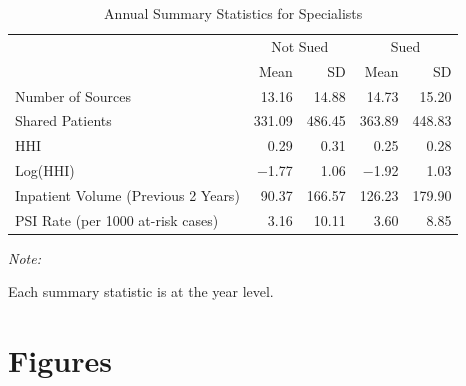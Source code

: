 \documentclass[
  12pt,
]{article}
\begin{document}
\FloatBarrier

\begin{table}

\caption{\label{tab:sumstats}Annual Summary Statistics for Specialists}
\centering
\fontsize{10}{12}\selectfont
\begin{threeparttable}
\begin{tabular}[t]{lrrrr}
\toprule
\multicolumn{1}{c}{ } & \multicolumn{2}{c}{Not Sued} & \multicolumn{2}{c}{Sued} \\
\cmidrule(l{3pt}r{3pt}){2-3} \cmidrule(l{3pt}r{3pt}){4-5}
  & Mean & SD & Mean & SD\\
\midrule
Number of Sources & \num{13.16} & \num{14.88} & \num{14.73} & \num{15.20}\\
Shared Patients & \num{331.09} & \num{486.45} & \num{363.89} & \num{448.83}\\
HHI & \num{0.29} & \num{0.31} & \num{0.25} & \num{0.28}\\
Log(HHI) & \num{-1.77} & \num{1.06} & \num{-1.92} & \num{1.03}\\
Inpatient Volume (Previous 2 Years) & \num{90.37} & \num{166.57} & \num{126.23} & \num{179.90}\\
PSI Rate (per 1000 at-risk cases) & \num{3.16} & \num{10.11} & \num{3.60} & \num{8.85}\\
\bottomrule
\end{tabular}
\begin{tablenotes}
\item \textit{Note: } 
\item Each summary statistic is at the year level.
\end{tablenotes}
\end{threeparttable}
\end{table}

\FloatBarrier

\newpage

\hypertarget{figures}{%
\section{Figures}\label{figures}}

\FloatBarrier
\end{document}
